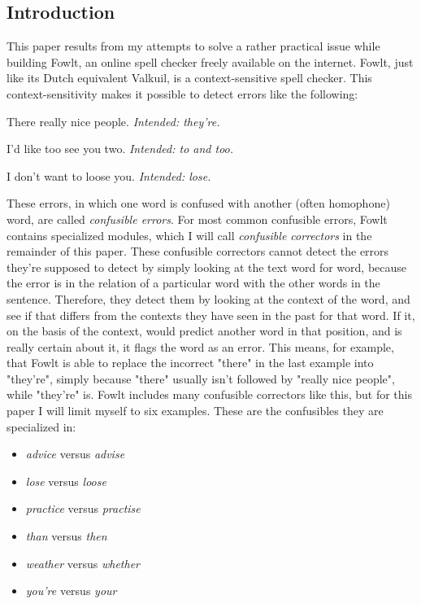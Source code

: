 \documentclass[12pt]{article}
\begin{document}

\subsection{Introduction}

This paper results from my attempts to solve a rather practical issue while building Fowlt, an online spell checker freely available on the internet. Fowlt, just like its Dutch equivalent Valkuil, is a context-sensitive spell checker. This context-sensitivity makes it possible to detect errors like the following:

\begin{examples}

\item There really nice people. \emph{Intended: they're.}
\item I'd like too see you two. \emph{Intended: to and too.}
\item I don't want to loose you. \emph{Intended: lose.}

\end{examples}

These errors, in which one word is confused with another (often homophone) word, are called \emph{confusible errors}. For most common confusible errors, Fowlt contains specialized modules, which I will call \emph{confusible correctors} in the remainder of this paper. These confusible correctors cannot detect the errors they're supposed to detect by simply looking at the text word for word, because the error is in the relation of a particular word with the other words in the sentence. Therefore, they detect them by looking at the context of the word, and see if that differs from the contexts they have seen in the past for that word. If it, on the basis of the context, would predict another word in that position, and is really certain about it, it flags the word as an error. This means, for example, that Fowlt is able to replace the incorrect "there" in the last example into "they're", simply because "there" usually isn't followed by "really nice people", while "they're" is. Fowlt includes many confusible correctors like this, but for this paper I will limit myself to six examples. These are the confusibles they are specialized in: 

\begin{itemize}
\item \emph{advice} versus \emph{advise}
\item \emph{lose} versus \emph{loose}
\item \emph{practice} versus \emph{practise}
\item \emph{than} versus \emph{then}
\item \emph{weather} versus \emph{whether}
\item \emph{you're} versus \emph{your}
\end{itemize}
\end{document}
